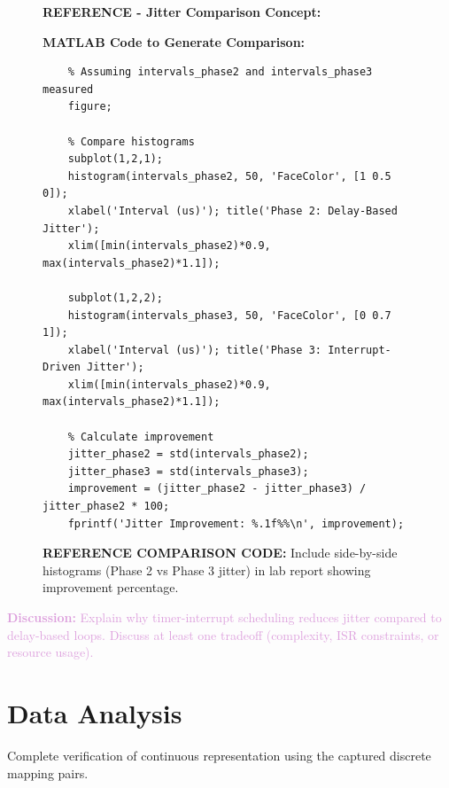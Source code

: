 \documentclass[11pt,letterpaper]{article}
\providecommand{\disECE}[1]{\textcolor{Plum}{\textbf{Discussion:} #1}}
\begin{document}
\begin{figure}[H]
    \centering
    \vspace{0.5in}
    \textbf{REFERENCE - Jitter Comparison Concept:}
    
    
    \vspace{0.3in}
    \textbf{MATLAB Code to Generate Comparison:}
    
    \begin{verbatim}
    % Assuming intervals_phase2 and intervals_phase3 measured
    figure;
    
    % Compare histograms
    subplot(1,2,1);
    histogram(intervals_phase2, 50, 'FaceColor', [1 0.5 0]);
    xlabel('Interval (us)'); title('Phase 2: Delay-Based Jitter');
    xlim([min(intervals_phase2)*0.9, max(intervals_phase2)*1.1]);
    
    subplot(1,2,2);
    histogram(intervals_phase3, 50, 'FaceColor', [0 0.7 1]);
    xlabel('Interval (us)'); title('Phase 3: Interrupt-Driven Jitter');
    xlim([min(intervals_phase2)*0.9, max(intervals_phase2)*1.1]);
    
    % Calculate improvement
    jitter_phase2 = std(intervals_phase2);
    jitter_phase3 = std(intervals_phase3);
    improvement = (jitter_phase2 - jitter_phase3) / jitter_phase2 * 100;
    fprintf('Jitter Improvement: %.1f%%\n', improvement);
    \end{verbatim}
    
    \vspace{0.3in}
    \caption{\textbf{REFERENCE COMPARISON CODE:} Include side-by-side histograms (Phase 2 vs Phase 3 jitter) in lab report showing improvement percentage.}
    \label{fig:jitter_comparison}
\end{figure}

\disECE{Explain why timer-interrupt scheduling reduces jitter compared to delay-based loops. Discuss at least one tradeoff (complexity, ISR constraints, or resource usage).}

\clearpage

\section{Data Analysis}
Complete verification of continuous representation using the captured discrete mapping pairs.
\end{document}
